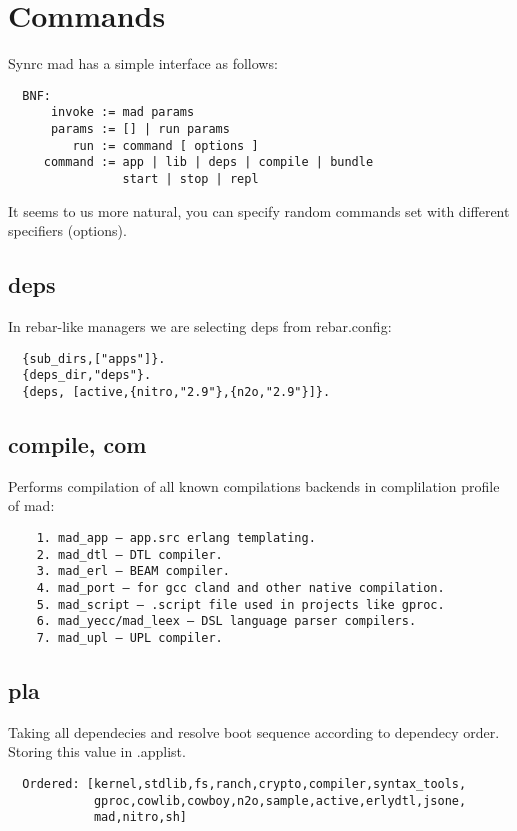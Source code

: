 \section{Commands}

Synrc mad has a simple interface as follows:

\vspace{1\baselineskip}
\begin{lstlisting}
  BNF:
      invoke := mad params
      params := [] | run params
         run := command [ options ]
     command := app | lib | deps | compile | bundle
                start | stop | repl
\end{lstlisting}
\vspace{1\baselineskip}

It seems to us more natural, you can specify random
commands set with different specifiers (options).

\subsection{deps}

In rebar-like managers we are selecting deps from rebar.config:
\vspace{1\baselineskip}
\begin{lstlisting}
  {sub_dirs,["apps"]}.
  {deps_dir,"deps"}.
  {deps, [active,{nitro,"2.9"},{n2o,"2.9"}]}.
\end{lstlisting}
\vspace{1\baselineskip}


\subsection{compile, com}
Performs compilation of all known compilations backends in complilation profile of mad:
\vspace{1\baselineskip}
\begin{lstlisting}
    1. mad_app — app.src erlang templating.
    2. mad_dtl — DTL compiler.
    3. mad_erl — BEAM compiler.
    4. mad_port — for gcc cland and other native compilation.
    5. mad_script — .script file used in projects like gproc.
    6. mad_yecc/mad_leex — DSL language parser compilers.
    7. mad_upl — UPL compiler.
\end{lstlisting}
\vspace{1\baselineskip}

\subsection{pla}
Taking all dependecies and resolve boot sequence according to dependecy order. Storing this value in .applist.
\vspace{1\baselineskip}
\begin{lstlisting}
  Ordered: [kernel,stdlib,fs,ranch,crypto,compiler,syntax_tools,
            gproc,cowlib,cowboy,n2o,sample,active,erlydtl,jsone,
            mad,nitro,sh]
\end{lstlisting}
\vspace{1\baselineskip}

